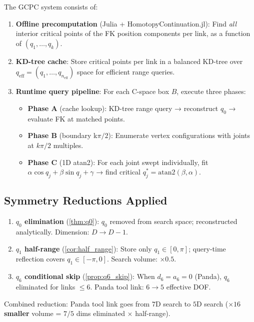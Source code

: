 \documentclass[11pt,a4paper]{article}
\begin{document}
The GCPC system consists of:
\begin{enumerate}
  \item \textbf{Offline precomputation} (Julia + HomotopyContinuation.jl):
        Find \emph{all} interior critical points of the FK position
        components per link, as a function of $(q_1,\ldots,q_k)$.
  \item \textbf{KD-tree cache}: Store critical points per link in a
        balanced KD-tree over $q_\text{eff} = (q_1,\ldots,q_{n_\text{eff}})$
        space for efficient range queries.
  \item \textbf{Runtime query pipeline}: For each C-space box $B$,
        execute three phases:
        \begin{itemize}
          \item \textbf{Phase A} (cache lookup): KD-tree range query
                → reconstruct $q_0$ → evaluate FK at matched points.
          \item \textbf{Phase B} (boundary k$\pi/2$): Enumerate vertex
                configurations with joints at $k\pi/2$ multiples.
          \item \textbf{Phase C} (1D atan2): For each joint swept
                individually, fit $\alpha\cos q_j + \beta\sin q_j + \gamma$
                → find critical $q_j^* = \text{atan2}(\beta, \alpha)$.
        \end{itemize}
\end{enumerate}

\subsection{Symmetry Reductions Applied}

\begin{enumerate}
  \item \textbf{$q_0$ elimination} (\cref{thm:q0}):
        $q_0$ removed from search space; reconstructed analytically.
        Dimension: $D \to D-1$.
  \item \textbf{$q_1$ half-range} (\cref{cor:half_range}):
        Store only $q_1 \in [0,\pi]$; query-time reflection covers
        $q_1 \in [-\pi, 0]$. Search volume: $\times 0.5$.
  \item \textbf{$q_6$ conditional skip} (\cref{prop:q6_skip}):
        When $d_6 = a_6 = 0$ (Panda), $q_6$ eliminated for links $\le 6$.
        Panda tool link: $6 \to 5$ effective DOF.
\end{enumerate}

Combined reduction: Panda tool link goes from $7$D search to $5$D
search (\textbf{$\times 16$ smaller} volume = $7/5$ dims eliminated
$\times$ half-range).
\end{document}
